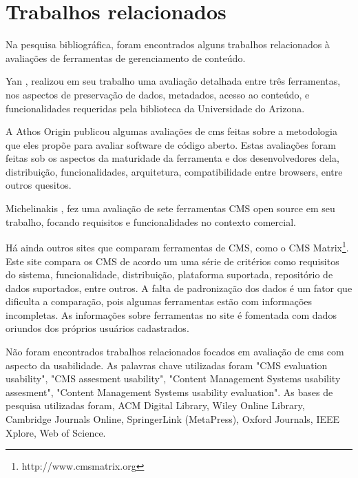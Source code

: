 \chapter{Trabalhos relacionados}

Na pesquisa bibliográfica, foram encontrados alguns trabalhos relacionados à avaliações de ferramentas de gerenciamento de conteúdo. 

Yan \cite{search_content_management}, realizou em seu trabalho uma avaliação detalhada entre três ferramentas, nos aspectos de preservação de dados, metadados, acesso ao conteúdo, e funcionalidades requeridas pela biblioteca da Universidade do Arizona.

A Athos Origin \cite{qsos_site} publicou algumas avaliações de cms feitas sobre a metodologia que eles propõe para avaliar software de código aberto. Estas avaliações foram feitas sob os aspectos da maturidade da ferramenta e dos desenvolvedores dela, distribuição, funcionalidades, arquitetura, compatibilidade entre browsers, entre outros quesitos. 

Michelinakis \cite{michelinakis_cms_evaluation}, fez uma avaliação de sete ferramentas CMS open source em seu trabalho, focando requisitos e funcionalidades no contexto comercial.

Há ainda outros sites que comparam ferramentas de CMS, como o CMS Matrix\footnote{http://www.cmsmatrix.org}. Este site compara os CMS de acordo um uma série de critérios como requisitos do sistema, funcionalidade, distribuição, plataforma suportada, repositório de dados suportados, entre outros. A falta de padronização dos dados é um fator que dificulta a comparação, pois algumas ferramentas estão com informações incompletas. As informações sobre ferramentas no site é fomentada com dados oriundos dos próprios usuários cadastrados.

Não foram encontrados trabalhos relacionados focados em avaliação de cms com aspecto da usabilidade. As palavras chave utilizadas foram "CMS evaluation usability", "CMS assesment usability", "Content Management Systems usability assesment", "Content Management Systems usability evaluation". As bases de pesquisa utilizadas foram, ACM Digital Library, Wiley Online Library, Cambridge Journals Online, SpringerLink (MetaPress), Oxford Journals, IEEE Xplore, Web of Science.


   

 
